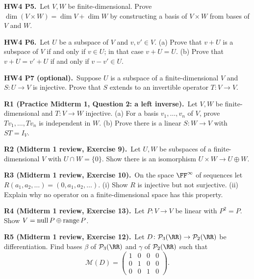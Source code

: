 \documentclass[10pt]{scrartcl}
\newcommand{\PP}{\mathcal P}\newcommand{\LL}{\mathcal L}\newcommand{\MM}{\mathcal M}
\begin{document}
\begin{prob}\textbf{HW4 P5.}\ Let $V,W$ be finite-dimensional. Prove $\dim(V\times W)=\dim V+\dim W$ by constructing a basis of $V\times W$ from bases of $V$ and $W$.


\end{prob}
\begin{prob}\textbf{HW4 P6.}\ Let $U$ be a subspace of $V$ and $v,v'\in V$. (a) Prove that $v+U$ is a subspace of $V$ if and only if $v\in U$; in that case $v+U=U$. (b) Prove that $v+U=v'+U$ if and only if $v-v'\in U$.


\end{prob}
\begin{prob}\textbf{HW4 P7 (optional).}\ Suppose $U$ is a subspace of a finite-dimensional $V$ and $S\colon U\to V$ is injective. Prove that $S$ extends to an invertible operator $T\colon V\to V$.


\end{prob}
\begin{prob}\textbf{R1 (Practice Midterm 1, Question 2: a left inverse).}\ Let $V,W$ be finite-dimensional and $T\colon V\to W$ injective. (a) For a basis $v_1,\dots,v_n$ of $V$, prove $Tv_1,\dots,Tv_n$ is independent in $W$. (b) Prove there is a linear $S\colon W\to V$ with $ST=I_V$.
\end{prob}
\begin{prob}\textbf{R2 (Midterm 1 review, Exercise 9).}\ Let $U,W$ be subspaces of a finite-dimensional $V$ with $U\cap W=\{0\}$. Show there is an isomorphism $U\times W\to U\oplus W$.
\end{prob}
\begin{prob}\textbf{R3 (Midterm 1 review, Exercise 10).}\ On the space $\FF^\infty$ of sequences let $R(a_1,a_2,\dots)=(0,a_1,a_2,\dots)$. (i) Show $R$ is injective but not surjective. (ii) Explain why no operator on a finite-dimensional space has this property.
\end{prob}
\begin{prob}\textbf{R4 (Midterm 1 review, Exercise 13).}\ Let $P\colon V\to V$ be linear with $P^2=P$. Show $V=\operatorname{null} P\oplus\operatorname{range} P$.
\end{prob}
\begin{prob}\textbf{R5 (Midterm 1 review, Exercise 12).}\ Let $D\colon\PP_3(\RR)\to\PP_2(\RR)$ be differentiation. Find bases $\beta$ of $\PP_3(\RR)$ and $\gamma$ of $\PP_2(\RR)$ such that
\[
  \MM(D) = \begin{pmatrix} 1 & 0 & 0 & 0 \\ 0 & 1 & 0 & 0 \\ 0 & 0 & 1 & 0 \end{pmatrix}.
\]
\end{prob}
\end{document}
